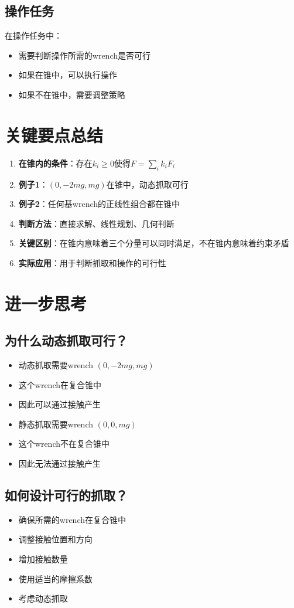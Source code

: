 \documentclass[12pt,a4paper]{article}
\begin{document}
\subsection{操作任务}

在操作任务中：
\begin{itemize}
    \item 需要判断操作所需的wrench是否可行
    \item 如果在锥中，可以执行操作
    \item 如果不在锥中，需要调整策略
\end{itemize}

\section{关键要点总结}

\begin{enumerate}
    \item \textbf{在锥内的条件}：存在$k_i \geq 0$使得$F = \sum_i k_i F_i$
    
    \item \textbf{例子1}：$(0, -2mg, mg)$在锥中，动态抓取可行
    
    \item \textbf{例子2}：任何基wrench的正线性组合都在锥中
    
    \item \textbf{判断方法}：直接求解、线性规划、几何判断
    
    \item \textbf{关键区别}：在锥内意味着三个分量可以同时满足，不在锥内意味着约束矛盾
    
    \item \textbf{实际应用}：用于判断抓取和操作的可行性
\end{enumerate}

\section{进一步思考}

\subsection{为什么动态抓取可行？}

\begin{itemize}
    \item 动态抓取需要wrench $(0, -2mg, mg)$
    \item 这个wrench在复合锥中
    \item 因此可以通过接触产生
    \item 静态抓取需要wrench $(0, 0, mg)$
    \item 这个wrench不在复合锥中
    \item 因此无法通过接触产生
\end{itemize}

\subsection{如何设计可行的抓取？}

\begin{itemize}
    \item 确保所需的wrench在复合锥中
    \item 调整接触位置和方向
    \item 增加接触数量
    \item 使用适当的摩擦系数
    \item 考虑动态抓取
\end{itemize}
\end{document}
